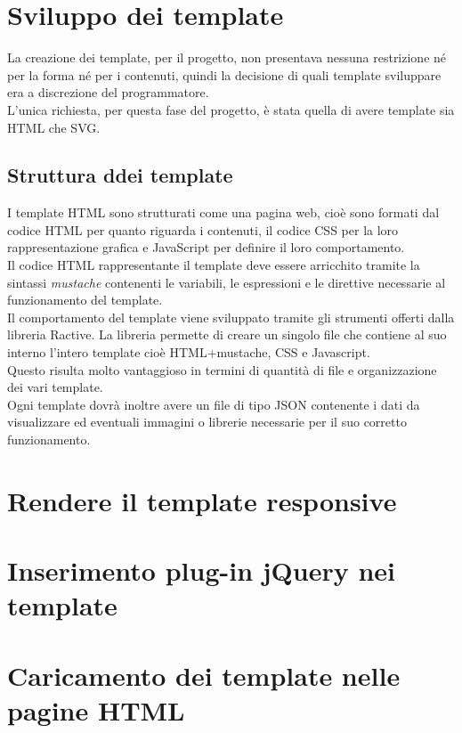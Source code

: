 \section{Sviluppo dei template}
La creazione dei template, per il progetto, non presentava nessuna restrizione né per la forma né per i contenuti, quindi la decisione di quali template sviluppare era a discrezione del programmatore.\\
L'unica richiesta, per questa fase del progetto, è stata quella di avere template sia HTML che SVG.\\
\subsection{Struttura ddei template}
I template HTML sono strutturati come una pagina web, cioè sono formati dal codice HTML per quanto riguarda i contenuti, il codice CSS per la loro rappresentazione grafica e JavaScript per definire il loro comportamento.\\
Il codice HTML rappresentante il template deve essere arricchito tramite la sintassi \textit{mustache} contenenti le variabili, le espressioni e le direttive necessarie al funzionamento del template.\\
Il comportamento del template viene sviluppato tramite gli strumenti offerti dalla libreria Ractive.
La libreria permette di creare un singolo file che contiene al suo interno l'intero template cioè HTML+mustache, CSS e Javascript.\\
Questo risulta molto vantaggioso in termini di quantità di file e organizzazione dei vari template.\\
Ogni template dovrà inoltre avere un file di tipo JSON contenente i dati da visualizzare ed eventuali immagini o librerie necessarie per il suo corretto funzionamento. 

\section{Rendere il template responsive}

\section{Inserimento plug-in jQuery nei template}

\section{Caricamento dei template nelle pagine HTML}

